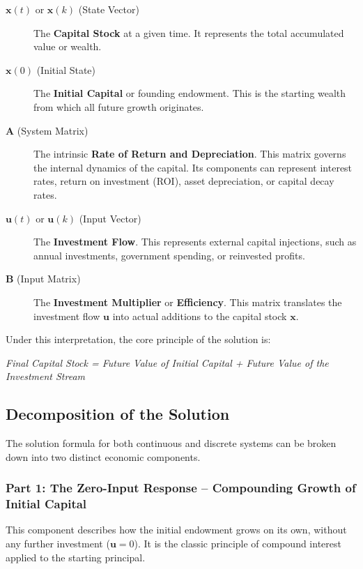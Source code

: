 \begin{description}
    \item[$\mathbf{x}(t)$ or $\mathbf{x}(k)$ (State Vector)] The \textbf{Capital Stock} at a given time. It represents the total accumulated value or wealth.

    \item[$\mathbf{x}(0)$ (Initial State)] The \textbf{Initial Capital} or founding endowment. This is the starting wealth from which all future growth originates.

    \item[$\mathbf{A}$ (System Matrix)] The intrinsic \textbf{Rate of Return and Depreciation}. This matrix governs the internal dynamics of the capital. Its components can represent interest rates, return on investment (ROI), asset depreciation, or capital decay rates.

    \item[$\mathbf{u}(t)$ or $\mathbf{u}(k)$ (Input Vector)] The \textbf{Investment Flow}. This represents external capital injections, such as annual investments, government spending, or reinvested profits.

    \item[$\mathbf{B}$ (Input Matrix)] The \textbf{Investment Multiplier} or \textbf{Efficiency}. This matrix translates the investment flow $\mathbf{u}$ into actual additions to the capital stock $\mathbf{x}$.
\end{description}

Under this interpretation, the core principle of the solution is:
\begin{center}
    \textit{Final Capital Stock = Future Value of Initial Capital + Future Value of the Investment Stream}
\end{center}

\subsection{Decomposition of the Solution}

The solution formula for both continuous and discrete systems can be broken down into two distinct economic components.

\subsubsection{Part 1: The Zero-Input Response -- Compounding Growth of Initial Capital}

This component describes how the initial endowment grows on its own, without any further investment ($\mathbf{u} = 0$). It is the classic principle of compound interest applied to the starting principal.

